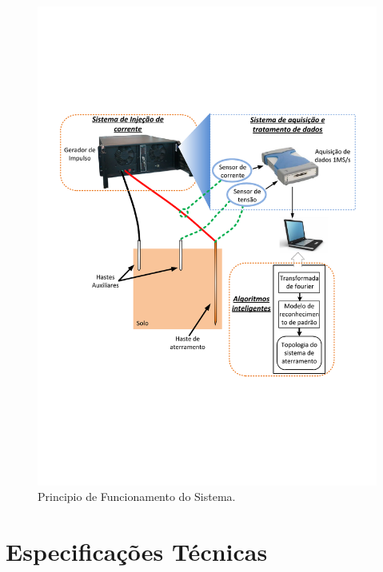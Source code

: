 \documentclass[a4paper, 10pt]{article}
\begin{document}
\begin{figure}[!h]
        \caption{\label{fig_principio_funcionamento}Principio de Funcionamento do Sistema.}
	    \begin{center}
            \includegraphics[scale=0.5]{esquema_de_ligacao.pdf}
	    \end{center}
\end{figure}

\newpage
\section{Especificações Técnicas}
\end{document}
